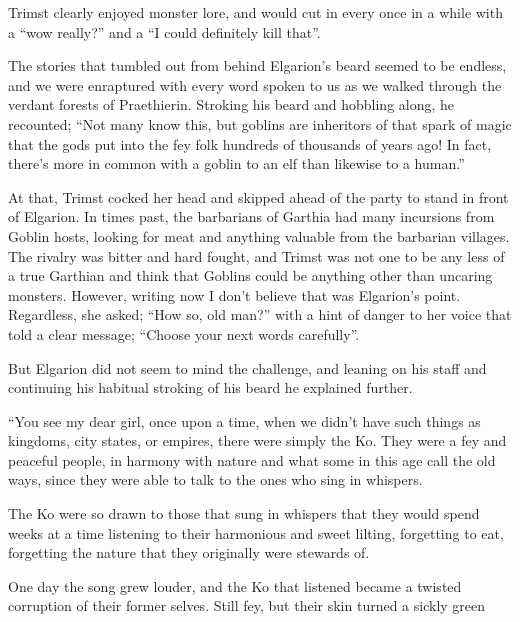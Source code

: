\documentclass[12pt, a4paper]{book}
\begin{document}
Trimst clearly enjoyed monster lore, and would cut in every once in a while with a ``wow really?'' and a ``I could definitely kill that''.

The stories that tumbled out from behind Elgarion's beard seemed to be endless, and we were enraptured with every word spoken to us as we walked through the verdant forests of Praethierin. Stroking his beard and hobbling along, he recounted; ``Not many know this, but goblins are inheritors of that spark of magic that the gods put into the fey folk hundreds of thousands of years ago! In fact, there's more in common with a goblin to an elf than likewise to a human.''

At that, Trimst cocked her head and skipped ahead of the party to stand in front of Elgarion. In times past, the barbarians of Garthia had many incursions from Goblin hosts, looking for meat and anything valuable from the barbarian villages. The rivalry was bitter and hard fought, and Trimst was not one to be any less of a true Garthian and think that Goblins could be anything other than uncaring monsters. However, writing now I don't believe that was Elgarion's point. Regardless, she asked; ``How so, old man?'' with a hint of danger to her voice that told a clear message; ``Choose your next words carefully''.

But Elgarion did not seem to mind the challenge, and leaning on his staff and continuing his habitual stroking of his beard he explained further.

``You see my dear girl, once upon a time, when we didn't have such things as kingdoms, city states, or empires, there were simply the Ko. They were a fey and peaceful people, in harmony with nature and what some in this age call the old ways, since they were able to talk to the ones who sing in whispers.

The Ko were so drawn to those that sung in whispers that they would spend weeks at a time listening to their harmonious and sweet lilting, forgetting to eat, forgetting the nature that they originally were stewards of.

One day the song grew louder, and the Ko that listened became a twisted corruption of their former selves. Still fey, but their skin turned a sickly green
\end{document}
